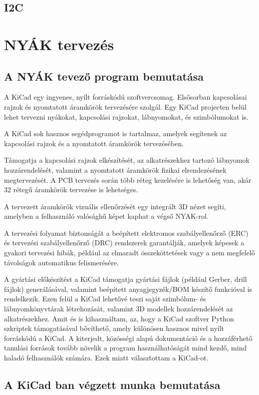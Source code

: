 \documentclass[a4paper,12pt,oneside]{book}
\begin{document}
\subsection{I2C}
\section{NYÁK tervezés}
\subsection{A NYÁK tevező program bemutatása}
A KiCad egy ingyenes, nyílt forráskódú szoftvercsomag. Elsősorban kapcsolásai rajzok és nyomtatott áramkörök tervezésére szolgál. Egy KiCad projecten belül lehet tervezni nyákokat, kapcsolási rajzokat, lábnyomokat, és szimbólumokat is.

A KiCad sok hasznos segédprogramot is tartalmaz, amelyek segítenek az kapcsolási rajzok és a nyomtatott áramkörök tervezésében. 

Támogatja a kapcsolási rajzok elkészítését, az alkatrészekhez tartozó lábnyomok hozzárendelését, valamint a nyomtatott áramkörök fizikai elrendezésének megtervezését. A PCB tervezés során több réteg kezelésére is lehetőség van, akár 32 rétegű áramkörök tervezése is lehetséges. 

A tervezett áramkörök vizuális ellenőrzését egy integrált 3D nézet segíti, amelyben a felhasználó valósághű képet kaphat a végső NYAK-rol. 

A tervezési folyamat biztonságát a beépített elektromos szabályellenőrző (ERC) és tervezési szabályellenőrző (DRC) rendszerek garantálják, amelyek képesek a gyakori tervezési hibák, például az elmaradt összeköttetések vagy a nem megfelelő távolságok automatikus felismerésére. 

A gyártási előkészítést a KiCad támogatja gyártási fájlok (például Gerber, drill fájlok) generálásával, valamint beépített anyagjegyzék/BOM készítő funkcióval is rendelkezik. Ezen felül a KiCad lehetővé teszi saját szimbólum- és lábnyomkönyvtárak létrehozását, valamint 3D modellek hozzárendelését az alkatrészekhez. 
Amit és is kihasználtam, az, hogy a KiCad szoftver Python szkriptek támogatásával bővíthető, amely különösen hasznos mivel nyílt forráskódú a KiCad. A kiterjedt, közösségi alapú dokumentáció és a hozzáférhető tanulási források tovább növelik a program használhatóságát mind kezdő, mind haladó felhasználók számára. Ezek miatt választottam a KiCad-ot.
\subsection{A KiCad ban végzett munka bemutatása} 
\end{document}
